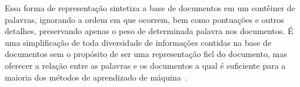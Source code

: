 Essa forma de representação sintetiza a base de documentos em um contêiner de palavras, ignorando a ordem em que ocorrem, bem como pontuações e outros detalhes, preservando apenas o peso de determinada palavra nos documentos. É uma simplificação de toda diversidade de informações contidas na base de documentos sem o propósito de ser uma representação fiel do documento, mas oferecer a relação entre as palavras e os documentos a qual é suficiente para a maioria dos métodos de aprendizado de máquina~\cite{Rezende2003}. 







